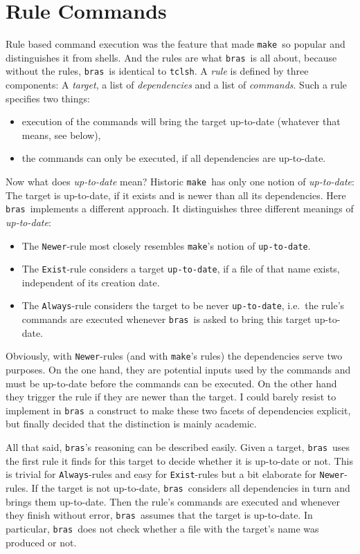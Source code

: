 \documentclass[12pt]{article}
\newcommand{\bras}{\texttt{bras}}
\newcommand{\make}{\texttt{make}}
\begin{document}
\section{Rule Commands}

Rule based command execution was the feature that made \make\ so
popular and distinguishes it from shells. And the rules are what
\bras\ is all about, because without the rules, \bras\ is identical to
\texttt{tclsh}. A \textit{rule} is defined by three components: A
\textit{target}, a list of \textit{dependencies} and a list of
\textit{commands}. Such a rule specifies two things:
\begin{itemize}
\item execution of the commands will bring the target up-to-date
(whatever that means, see below),
\item the commands can only be executed, if all dependencies are
up-to-date.
\end{itemize}

Now what does \textit{up-to-date} mean? Historic \make\ has only one
notion of \textit{up-to-date}: The target is up-to-date, if it exists
and is newer than all its dependencies. Here \bras\
implements a different approach. It distinguishes three different
meanings of \textit{up-to-date}:

\begin{itemize}
\item The \texttt{Newer}-rule most closely resembles \make's notion of
\texttt{up-to-date}.
\item The \texttt{Exist}-rule considers a target \texttt{up-to-date},
if a file of that name exists, independent of its creation date.
\item The \texttt{Always}-rule considers the target to be never
\texttt{up-to-date}, i.e.\ the rule's commands are executed whenever
\bras\ is asked to bring this target up-to-date.
\end{itemize}

Obviously, with \texttt{Newer}-rules (and with \make's rules) the
dependencies serve two purposes. On the one hand, they are potential
inputs used by the commands and must be up-to-date before the commands
can be executed. On the other hand they trigger the rule if they are
newer than the target. I could barely resist to implement in \bras\ a
construct to make these two facets of dependencies explicit, but
finally decided that the distinction is mainly academic.

All that said, \bras's reasoning can be described easily. Given a
target, \bras\ uses the first rule it finds for this target to decide
whether it is up-to-date or not. This is trivial for
\texttt{Always}-rules and easy for \texttt{Exist}-rules but a bit
elaborate for \texttt{Newer}-rules. If the target is not up-to-date,
\bras\ considers all dependencies in turn and brings them
up-to-date. Then the rule's commands are executed and whenever they
finish without error, \bras\ assumes that the target is up-to-date. In
particular, \bras\ does not check whether a file with the target's
name was produced or not.
\end{document}
